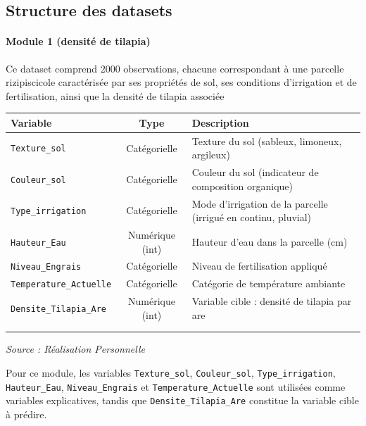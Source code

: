 \documentclass[a4paper,12pt, oneside]{article}
\begin{document}
\subsection{Structure des datasets}

\paragraph{Module 1 (densité de tilapia)\\}
Ce dataset comprend 2000 observations, chacune correspondant à une parcelle rizipiscicole caractérisée par ses propriétés de sol, ses conditions d'irrigation et de fertilisation, ainsi que la densité de tilapia associée

\begin{longtable}{|m{}|c|m{}|}
\hline
\textbf{Variable} & \textbf{Type} & \textbf{Description} \\
\hline
\texttt{Texture\_sol} & Catégorielle & Texture du sol (sableux, limoneux, argileux) \\
\hline
\texttt{Couleur\_sol} & Catégorielle & Couleur du sol (indicateur de composition organique) \\
\hline
\texttt{Type\_irrigation} & Catégorielle & Mode d'irrigation de la parcelle (irrigué en continu, pluvial) \\
\hline
\texttt{Hauteur\_Eau} & Numérique (int) & Hauteur d'eau dans la parcelle (cm) \\
\hline
\texttt{Niveau\_Engrais} & Catégorielle & Niveau de fertilisation appliqué \\
\hline
\texttt{Temperature\_Actuelle} & Catégorielle & Catégorie de température ambiante \\
\hline
\texttt{Densite\_Tilapia\_Are} & Numérique (int) & Variable cible : densité de tilapia par are \\
\hline
\caption{Structure du dataset -- Module 1\\}
\end{longtable}
\begin{center}
\vspace{-0.85cm}
\textit{Source : Réalisation Personnelle}
\end{center}

Pour ce module, les variables \texttt{Texture\_sol}, \texttt{Couleur\_sol}, \texttt{Type\_irrigation}, \texttt{Hauteur\_Eau}, \texttt{Niveau\_Engrais} et \texttt{Temperature\_Actuelle} sont utilisées comme variables explicatives, tandis que \texttt{Densite\_Tilapia\_Are} constitue la variable cible à prédire.
\end{document}
